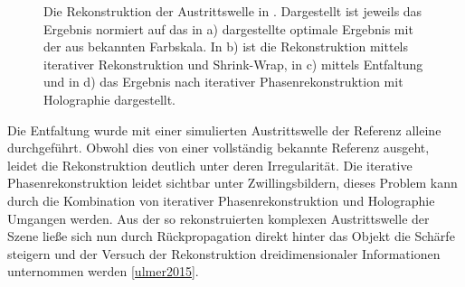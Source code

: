 \begin{figure}
	\centering
	\caption[Rekonstruktion einer Austrittswelle]{Die Rekonstruktion der Austrittswelle in . Dargestellt ist jeweils das Ergebnis normiert auf das in a) dargestellte optimale Ergebnis mit der aus  bekannten Farbskala. In b) ist die Rekonstruktion mittels iterativer Rekonstruktion und Shrink-Wrap, in c) mittels Entfaltung und in d) das Ergebnis nach iterativer Phasenrekonstruktion mit Holographie dargestellt.}
	\label{fig:recon3d}
\end{figure}	
Die Entfaltung wurde mit einer simulierten Austrittswelle der Referenz alleine durchgeführt. Obwohl dies von einer vollständig bekannte Referenz ausgeht, leidet die Rekonstruktion deutlich unter deren Irregularität. Die iterative Phasenrekonstruktion leidet sichtbar unter Zwillingsbildern, dieses Problem kann durch die Kombination von iterativer Phasenrekonstruktion und Holographie Umgangen werden. 
Aus der so rekonstruierten komplexen Austrittswelle der Szene ließe sich nun durch Rückpropagation direkt hinter das Objekt die Schärfe steigern und der Versuch der Rekonstruktion dreidimensionaler Informationen unternommen werden \ref{ulmer2015}.

